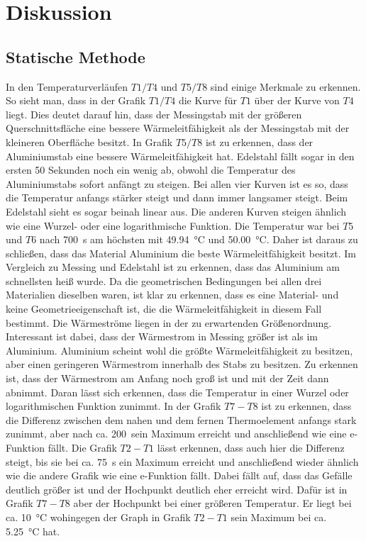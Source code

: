 \section{Diskussion}
\label{sec:Diskussion}

\subsection{Statische Methode}
In den Temperaturverläufen $T1/T4$ und $T5/T8$ sind einige Merkmale zu erkennen. 
So sieht man, dass in der Grafik $T1/T4$ die Kurve für $T1$ über der Kurve von $T4$ liegt. Dies deutet darauf hin, dass der Messingstab mit der größeren Querschnittsfläche eine bessere Wärmeleitfähigkeit als der Messingstab mit der kleineren Oberfläche besitzt. 
In Grafik $T5/T8$ ist zu erkennen, dass der Aluminiumstab eine bessere Wärmeleitfähigkeit hat. Edelstahl fällt sogar in den ersten 50 Sekunden noch ein wenig ab, obwohl die Temperatur des Aluminiumstabs sofort anfängt zu steigen. 
Bei allen vier Kurven ist es so, dass die Temperatur anfangs stärker steigt und dann immer langsamer steigt. Beim Edelstahl sieht es sogar beinah linear aus. Die anderen Kurven steigen ähnlich wie eine Wurzel- oder eine logarithmische Funktion. 
Die Temperatur war bei $T5$ und $T6$ nach \SI{700}{\second} am höchsten mit \SI{49.94}{\degreeCelsius} und \SI{50.00}{\degreeCelsius}. Daher ist daraus zu schließen, dass das Material Aluminium die beste Wärmeleitfähigkeit besitzt. 
Im Vergleich zu Messing und Edelstahl ist zu erkennen, dass das Aluminium  am schnellsten heiß wurde. Da die geometrischen
Bedingungen bei allen drei Materialien dieselben waren, ist klar zu erkennen, dass es eine Material- und keine
Geometrieeigenschaft ist, die die Wärmeleitfähigkeit in diesem Fall bestimmt. 
Die Wärmeströme liegen in der zu erwartenden Größenordnung. Interessant ist dabei, dass der Wärmestrom in Messing größer ist als im Aluminium. Aluminium scheint wohl die größte Wärmeleitfähigkeit zu besitzen, aber einen geringeren Wärmestrom innerhalb des Stabs zu besitzen. 
Zu erkennen ist, dass der Wärmestrom am Anfang noch groß ist und mit der Zeit dann abnimmt. Daran lässt sich erkennen, dass die Temperatur 
in einer Wurzel oder logarithmischen Funktion zunimmt.  
In der Grafik $T7-T8$ ist zu erkennen, dass die Differenz zwischen dem nahen und dem fernen Thermoelement anfangs stark zunimmt, aber nach ca. \SI{200}{\second}ein Maximum erreicht und anschließend wie eine e-Funktion fällt. Die Grafik $T2-T1$ lässt erkennen, dass auch hier die Differenz steigt, bis sie bei ca. \SI{75}{\second} ein Maximum erreicht und anschließend wieder ähnlich wie die andere Grafik wie eine e-Funktion fällt. Dabei fällt auf, dass das Gefälle deutlich größer ist und der Hochpunkt deutlich eher erreicht wird. Dafür ist in Grafik $T7-T8$ aber der Hochpunkt bei einer größeren Temperatur. Er liegt bei ca. \SI{10}{\degreeCelsius} wohingegen der Graph in Grafik $T2-T1$ sein Maximum bei ca. \SI{5.25}{\degreeCelsius} hat.


